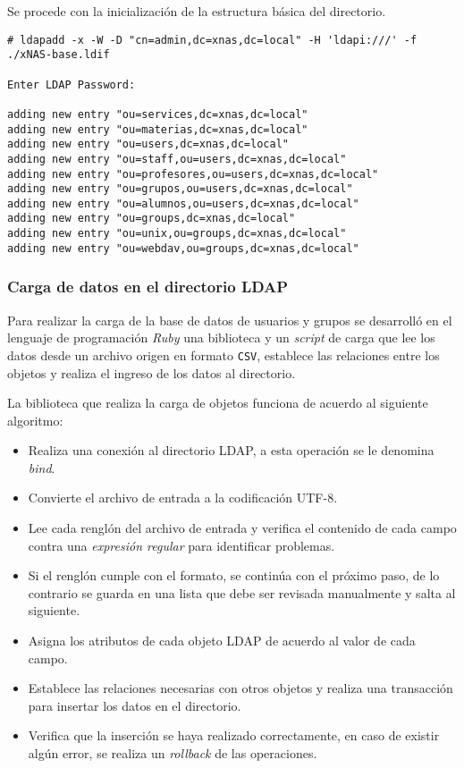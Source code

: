 Se procede con la inicializaci\'{o}n de la estructura b\'{a}sica del directorio.

{
\scriptsize
\linespread{1}
\begin{verbatim}
# ldapadd -x -W -D "cn=admin,dc=xnas,dc=local" -H 'ldapi:///' -f ./xNAS-base.ldif

Enter LDAP Password: 

adding new entry "ou=services,dc=xnas,dc=local"
adding new entry "ou=materias,dc=xnas,dc=local"
adding new entry "ou=users,dc=xnas,dc=local"
adding new entry "ou=staff,ou=users,dc=xnas,dc=local"
adding new entry "ou=profesores,ou=users,dc=xnas,dc=local"
adding new entry "ou=grupos,ou=users,dc=xnas,dc=local"
adding new entry "ou=alumnos,ou=users,dc=xnas,dc=local"
adding new entry "ou=groups,dc=xnas,dc=local"
adding new entry "ou=unix,ou=groups,dc=xnas,dc=local"
adding new entry "ou=webdav,ou=groups,dc=xnas,dc=local"
\end{verbatim}
}

\newpage
          \subsubsection {Carga de datos en el directorio \textsc{LDAP}}

Para realizar la carga de la base de datos de usuarios y grupos se desarroll\'{o} en el lenguaje de programaci\'{o}n \textsl{Ruby} una biblioteca y un \textit{script} de carga que lee los datos desde un archivo origen en formato \texttt{CSV}, establece las relaciones entre los objetos y realiza el ingreso de los datos al directorio.

La biblioteca que realiza la carga de objetos funciona de acuerdo al siguiente algoritmo:

\begin{itemize}
  \item Realiza una conexi\'{o}n al directorio LDAP, a esta operaci\'{o}n se le denomina \textit{bind}.
  \item Convierte el archivo de entrada a la codificaci\'{o}n \textsc{UTF-8}.
  \item Lee cada rengl\'{o}n del archivo de entrada y verifica el contenido de cada campo contra una \textit{expresi\'{o}n regular} para identificar problemas.
  \item Si el rengl\'{o}n cumple con el formato, se contin\'{u}a con el pr\'{o}ximo paso, de lo contrario se guarda en una lista que debe ser revisada manualmente y salta al siguiente.
  \item Asigna los atributos de cada objeto LDAP de acuerdo al valor de cada campo.
  \item Establece las relaciones necesarias con otros objetos y realiza una transacci\'{o}n para insertar los datos en el directorio.
  \item Verifica que la inserci\'{o}n se haya realizado correctamente, en caso de existir alg\'{u}n error, se realiza un \textit{rollback} de las operaciones.
\end{itemize}

